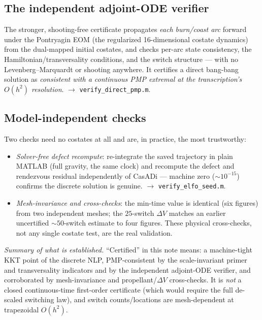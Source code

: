 \documentclass[11pt]{article}
\newcommand{\file}[1]{\texttt{\small #1}}
\begin{document}
\subsection{The independent adjoint-ODE verifier}
The stronger, shooting-free certificate propagates \emph{each burn/coast arc}
forward under the Pontryagin EOM (the regularized 16-dimensional costate
dynamics) from the dual-mapped initial costates, and checks per-arc state
consistency, the Hamiltonian/transversality conditions, and the switch structure
--- with no Levenberg--Marquardt or shooting anywhere. It certifies a direct
bang-bang solution as \emph{consistent with a continuous PMP extremal at the
transcription's $O(h^2)$ resolution}. $\rightarrow$ \file{verify\_direct\_pmp.m}.

\subsection{Model-independent checks}
Two checks need no costates at all and are, in practice, the most trustworthy:
\begin{itemize}
  \item \emph{Solver-free defect recompute}: re-integrate the saved trajectory
        in plain MATLAB (full gravity, the same clock) and recompute the defect
        and rendezvous residual independently of CasADi --- machine zero
        ($\sim10^{-15}$) confirms the discrete solution is genuine.
        $\rightarrow$ \file{verify\_elfo\_seed.m}.
  \item \emph{Mesh-invariance and cross-checks}: the min-time value is identical
        (six figures) from two independent meshes; the $25$-switch $\Delta V$
        matches an earlier uncertified $\sim\!50$-switch estimate to four
        figures. These physical cross-checks, not any single costate test, are
        the real validation.
\end{itemize}

\medskip\noindent\emph{Summary of what is established.} ``Certified'' in this
note means: a machine-tight KKT point of the discrete NLP, PMP-consistent by the
scale-invariant primer and transversality indicators and by the independent
adjoint-ODE verifier, and corroborated by mesh-invariance and propellant/$\Delta
V$ cross-checks. It is \emph{not} a closed continuous-time first-order
certificate (which would require the full de-scaled switching law), and switch
counts/locations are mesh-dependent at trapezoidal $O(h^2)$.

\end{document}
